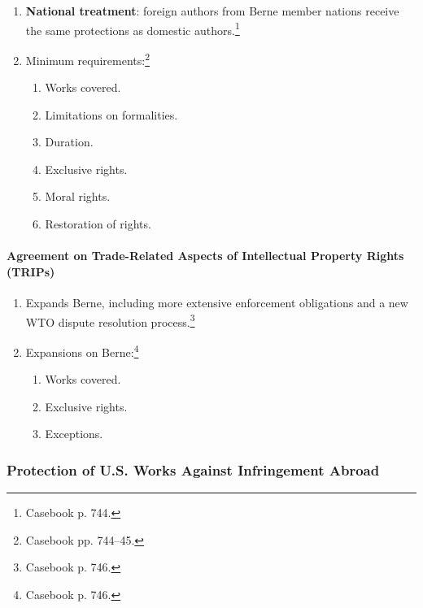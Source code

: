 \begin{enumerate}
    \item \textbf{National treatment}: foreign authors from Berne member 
    nations receive the same protections as domestic 
    authors.\footnote{Casebook p. 744.}
    \item Minimum requirements:\footnote{Casebook pp. 744--45.}
    \begin{enumerate}
        \item Works covered.
        \item Limitations on formalities.
        \item Duration.
        \item Exclusive rights.
        \item Moral rights.
        \item Restoration of rights.
    \end{enumerate}
\end{enumerate}

\paragraph{Agreement on Trade-Related Aspects of Intellectual Property Rights 
(TRIPs)}

\begin{enumerate}
    \item Expands Berne, including more extensive enforcement obligations and 
    a new WTO dispute resolution process.\footnote{Casebook p. 746.}
    \item Expansions on Berne:\footnote{Casebook p. 746.}
    \begin{enumerate}
        \item Works covered.
        \item Exclusive rights.
        \item Exceptions.
    \end{enumerate}
\end{enumerate}

\subsubsection{Protection of U.S. Works Against Infringement Abroad}

